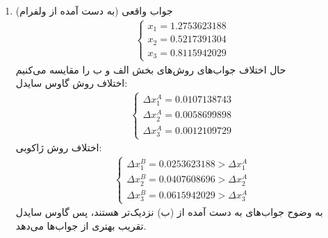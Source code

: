 {\begin{enumerate}
\begin{align*}
        &x_1 - 1(x_2) + 4x_3 = 4 \xrightarrow{(x_1, x_2) = (1,0.25)} 1 - 0.25 + 4x_3 = 4 \rightarrow x_3 = 0.8125
    \end{align*}
    دور دوم:
    \begin{align*}
        &4x_1 + 0.25 - 2(0.8125) = 4 \rightarrow x_1 = 1.34375 \\
        &-x_1 + 4x_2 - 0.8125 = 0 \xrightarrow{\text{از بالایی}} x_2 = 0.5390625 \\
        &x_1 - x_2 + 4x_3 = 4 \xrightarrow{\text{از بالایی ها}} x_3 = 0.798828125
    \end{align*}
    \newpage
    دور سوم:
    \begin{align*}
        &4x_1 + 0.5390625 - 2(0.798828125) = 4 \rightarrow x_1 = 1.2646484375 \\
        &-x_1 + 4x_2 - 0.798828125 = 0 \xrightarrow{\text{از بالایی}} x_2 = 0.5158691406 \\
        &x_1 - x_2 + 4x_3 = 4 \xrightarrow{\text{از بالایی ها}} x_3 = 0.8128051758
    \end{align*}
    \item 
    جواب واقعی (به دست آمده از ولفرام)
    \begin{align*}
        \begin{cases}
            x_1 = 1.2753623188 \\ 
            x_2 = 0.5217391304 \\
            x_3 = 0.8115942029
        \end{cases}
    \end{align*}
    حال اختلاف جواب‌های روش‌های بخش الف و ب را مقایسه می‌کنیم
    \\
    اختلاف روش گاوس سایدل:
    \begin{align*}
        \begin{cases}
            \Delta x_1^{A} = 0.0107138743 \\
            \Delta x_2^{A} = 0.0058699898 \\
            \Delta x_3^{A} = 0.0012109729
        \end{cases}
    \end{align*}
    اختلاف روش ژاکوبی:
    \begin{align*}
        \begin{cases}
            \Delta x_1^{B} = 0.0253623188 > \Delta x_1^{A} \\
            \Delta x_2^{B} = 0.0407608696 > \Delta x_2^{A} \\
            \Delta x_3^{B} = 0.0615942029 > \Delta x_3^{A}
        \end{cases}
    \end{align*}
    به وضوح جواب‌های به دست آمده از (ب) نزدیک‌تر هستند، پس گاوس سایدل تقریب بهتری از جواب‌ها می‌دهد.
\end{enumerate}
}